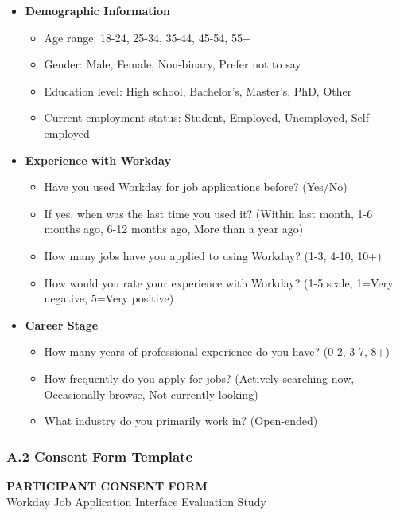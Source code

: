 \documentclass[
	letterpaper, %
]{jdf}
\begin{document}
\begin{itemize}
    \item \textbf{Demographic Information}
    \begin{itemize}
        \item Age range: 18-24, 25-34, 35-44, 45-54, 55+
        \item Gender: Male, Female, Non-binary, Prefer not to say
        \item Education level: High school, Bachelor's, Master's, PhD, Other
        \item Current employment status: Student, Employed, Unemployed, Self-employed
    \end{itemize}
    
    \item \textbf{Experience with Workday}
    \begin{itemize}
        \item Have you used Workday for job applications before? (Yes/No)
        \item If yes, when was the last time you used it? (Within last month, 1-6 months ago, 6-12 months ago, More than a year ago)
        \item How many jobs have you applied to using Workday? (1-3, 4-10, 10+)
        \item How would you rate your experience with Workday? (1-5 scale, 1=Very negative, 5=Very positive)
    \end{itemize}
    
    \item \textbf{Career Stage}
    \begin{itemize}
        \item How many years of professional experience do you have? (0-2, 3-7, 8+)
        \item How frequently do you apply for jobs? (Actively searching now, Occasionally browse, Not currently looking)
        \item What industry do you primarily work in? (Open-ended)
    \end{itemize}
\end{itemize}

\subsubsection{A.2 Consent Form Template}

\begin{center}
\textbf{PARTICIPANT CONSENT FORM}\\
Workday Job Application Interface Evaluation Study
\end{center}
\end{document}

